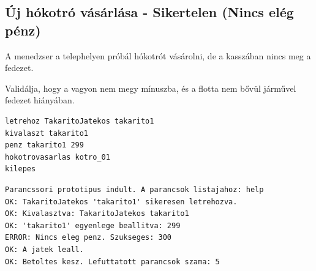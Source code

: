 \subsection{Új hókotró vásárlása - Sikertelen (Nincs elég pénz)}
\begin{test-case-description}
    A menedzser a telephelyen próbál hókotrót vásárolni, de a kasszában nincs meg a fedezet.
\end{test-case-description}
\begin{test-case-function}
    Validálja, hogy a vagyon nem megy mínuszba, és a flotta nem bővül járművel fedezet hiányában.
\end{test-case-function}
\begin{test-case-input}
\begin{verbatim}
letrehoz TakaritoJatekos takarito1
kivalaszt takarito1
penz takarito1 299
hokotrovasarlas kotro_01
kilepes
\end{verbatim}
\end{test-case-input}
\begin{test-case-output}
\begin{verbatim}
Parancssori prototipus indult. A parancsok listajahoz: help
OK: TakaritoJatekos 'takarito1' sikeresen letrehozva.
OK: Kivalasztva: TakaritoJatekos takarito1
OK: 'takarito1' egyenlege beallitva: 299
ERROR: Nincs eleg penz. Szukseges: 300
OK: A jatek leall.
OK: Betoltes kesz. Lefuttatott parancsok szama: 5
\end{verbatim}
\end{test-case-output}

